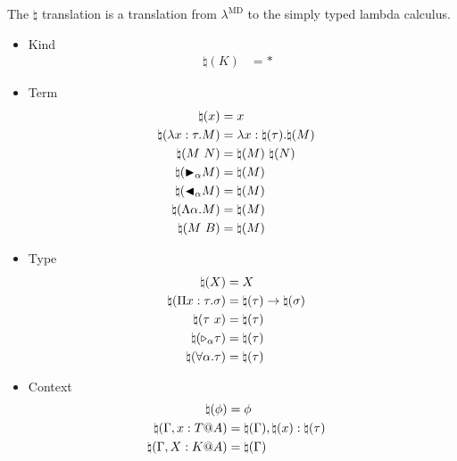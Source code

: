 \begin{definition}
    The $\natural$ translation is a translation from $\lambda^\text{MD}$ to the simply typed lambda calculus.
    \begin{multicols}{2}
        \begin{itemize}
            \item Kind
                \begin{align*}
                    \natural(K) &= * &
                \end{align*}
            \item Term
                \begin{align*}
                    \natural(x) &= x & \\
                    \natural(\lambda x:\tau.M) &= \lambda x:\natural(\tau).\natural(M) & \\
                    \natural(M\ N) &= \natural(M)\ \natural(N)& \\
                    \natural({\mathop{\blacktriangleright}}_\alpha M) &= \natural(M) & \\
                    \natural({\mathop{\blacktriangleleft}}_\alpha M) &= \natural(M)& \\
                    \natural(\Lambda\alpha.M) &= \natural(M)& \\
                    \natural(M\ B) &= \natural(M) &
                \end{align*}
            \item Type
            \begin{align*}
                \natural(X) &= X & \\
                \natural(\Pi x:\tau.\sigma) &= \natural(\tau) \to \natural(\sigma) & \\
                \natural(\tau\ x) &= \natural(\tau) & \\
                \natural({\mathop{\triangleright}}_\alpha \tau) &= \natural(\tau) & \\
                \natural(\forall \alpha.\tau) &= \natural(\tau) &
            \end{align*}
        \item Context
            \begin{align*}
                \natural(\phi) &= \phi & \\
                \natural(\Gamma, x:T@A) &= \natural(\Gamma), \natural(x):\natural(\tau) & \\
                \natural(\Gamma, X:K@A) &= \natural(\Gamma) &
            \end{align*}
    \end{itemize}
    \end{multicols}
\end{definition}

